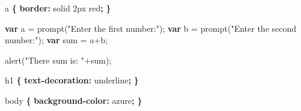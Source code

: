 \documentclass[]{memoir}
\newenvironment{Shaded}{}{}
\newcommand{\KeywordTok}[1]{\textcolor[rgb]{0.00,0.44,0.13}{\textbf{{#1}}}}
\newcommand{\DataTypeTok}[1]{\textcolor[rgb]{0.56,0.13,0.00}{{#1}}}
\newcommand{\StringTok}[1]{\textcolor[rgb]{0.25,0.44,0.63}{{#1}}}
\newcommand{\FunctionTok}[1]{\textcolor[rgb]{0.02,0.16,0.49}{{#1}}}
\newcommand{\NormalTok}[1]{{#1}}
\begin{document}
\begin{Shaded}
\begin{Highlighting}[]
\NormalTok{a }\KeywordTok{\{}
    \KeywordTok{border:} \DataTypeTok{solid} \DataTypeTok{2px} \DataTypeTok{red}\KeywordTok{;}
\KeywordTok{\}}
\end{Highlighting}
\end{Shaded}


\begin{Shaded}
\begin{Highlighting}[]
\KeywordTok{var} \NormalTok{a = }\FunctionTok{prompt}\NormalTok{(}\StringTok{"Enter the first number:"}\NormalTok{);}
\KeywordTok{var} \NormalTok{b = }\FunctionTok{prompt}\NormalTok{(}\StringTok{"Enter the second number:"}\NormalTok{);}
\KeywordTok{var} \NormalTok{sum = a+b;}

\FunctionTok{alert}\NormalTok{(}\StringTok{"There sum is: "}\NormalTok{+sum);}
\end{Highlighting}
\end{Shaded}


\begin{Shaded}
\begin{Highlighting}[]
\NormalTok{h1 }\KeywordTok{\{}
    \KeywordTok{text-decoration:} \DataTypeTok{underline}\KeywordTok{;}
\KeywordTok{\}}
\end{Highlighting}
\end{Shaded}


\begin{Shaded}
\begin{Highlighting}[]
\NormalTok{body }\KeywordTok{\{}
    \KeywordTok{background-color:} \NormalTok{azure}\KeywordTok{;}
\KeywordTok{\}}
\end{Highlighting}
\end{Shaded}
\end{document}
